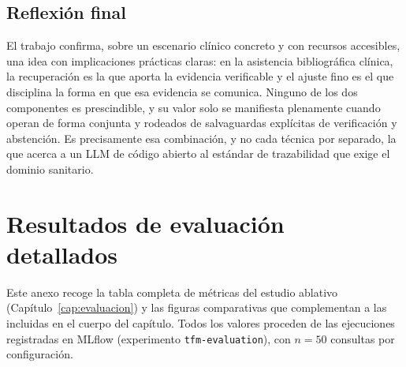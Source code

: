 \documentclass[11pt,a4paper,spanish]{book}
\numberwithin{equation}{chapter}
\numberwithin{figure}{chapter}
\begin{document}
\section{Reflexión final}
\label{sec:c7_reflexion}

El trabajo confirma, sobre un escenario clínico concreto y con recursos accesibles, una idea con implicaciones prácticas claras: en la asistencia bibliográfica clínica, la recuperación es la que aporta la evidencia verificable y el ajuste fino es el que disciplina la forma en que esa evidencia se comunica. Ninguno de los dos componentes es prescindible, y su valor solo se manifiesta plenamente cuando operan de forma conjunta y rodeados de salvaguardas explícitas de verificación y abstención. Es precisamente esa combinación, y no cada técnica por separado, la que acerca a un LLM de código abierto al estándar de trazabilidad que exige el dominio sanitario.




\appendix
\chapter{Resultados de evaluación detallados}
\label{anexo:eval}

Este anexo recoge la tabla completa de métricas del estudio ablativo (Capítulo~\ref{cap:evaluacion}) y las figuras comparativas que complementan a las incluidas en el cuerpo del capítulo. Todos los valores proceden de las ejecuciones registradas en MLflow (experimento \texttt{tfm-evaluation}), con $n=50$ consultas por configuración.
\end{document}
